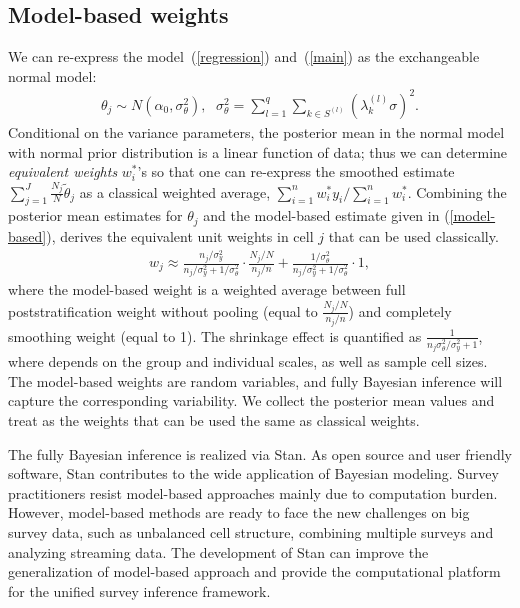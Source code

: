 \documentclass[11pt]{article}
\begin{document}
\subsection{Model-based weights}

We can re-express the model~(\ref{regression}) and~(\ref{main}) as the exchangeable normal model:	
\begin{align}
\label{theta-summary}
	\theta_j \sim N(\alpha_0, \sigma^2_{\theta})\mbox{, } \ \ \sigma^2_{\theta}=\sum_{l=1}^q\sum_{k\in S^{(l)}}(\lambda_k^{(l)}\sigma)^2.
\end{align}
Conditional on the variance parameters, the posterior mean in the normal model with normal prior distribution is a linear function of data; thus we can determine {\em equivalent weights} $w^*_i$'s so that one can re-express the smoothed estimate $\sum_{j=1}^J\frac{N_j}{N}\tilde{\theta}_j$ as a classical weighted average, $\sum_{i=1}^n w^*_iy_i/\sum_{i=1}^n w^*_i$. Combining the posterior mean estimates for $\theta_j$ and the model-based estimate given in (\ref{model-based}), \cite{gelman07} derives the equivalent unit weights in cell $j$ that can be used classically. 
\begin{align}
\label{model-w}
 	w_j\approx \frac{n_j/\sigma^2_y}{n_j/\sigma^2_y+1/\sigma_{\theta}^2}\cdot\frac{N_j/N}{n_j/n} +  \frac{1/\sigma^2_{\theta}}{n_j/	\sigma^2_y+1/\sigma_{\theta}^2} \cdot 1,
\end{align}
where the model-based weight is a weighted average between full poststratification weight without pooling (equal to $\frac{N_j/N}{n_j/n}$) and completely smoothing weight (equal to 1). The shrinkage effect is quantified as $\frac{1}{n_j\sigma^2_{\theta}/	\sigma^2_y	+1}$, where depends on the group and individual scales, as well as sample cell sizes. The model-based weights are random variables, and fully Bayesian inference will capture the corresponding variability. We collect the posterior mean values and treat as the weights that can be used the same as classical weights.

The fully Bayesian inference is realized via Stan. As open source and user friendly software, Stan contributes to the wide application of Bayesian modeling. Survey practitioners resist model-based approaches mainly due to computation burden. However, model-based methods are ready to face the new challenges on big survey data, such as unbalanced cell structure, combining multiple surveys and analyzing streaming data. The development of Stan can improve the generalization of model-based approach and provide the computational platform for the unified survey inference framework.
\end{document}
